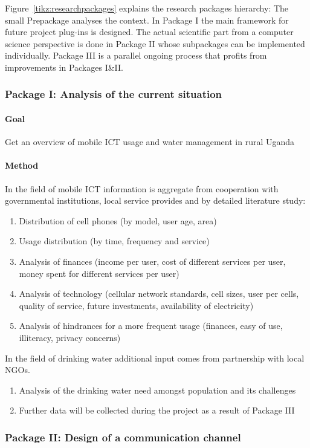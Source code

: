 \documentclass[11pt]{article}
\begin{document}
Figure~\ref{tikz:researchpackages} explains the research packages hierarchy: The small Prepackage analyses the context. In Package I the main framework for future project plug-ins is designed. The actual scientific part from a computer science perspective is done in Package II whose subpackages can be implemented individually. Package III is a parallel ongoing process that profits from improvements in Packages I\&II.


\subsubsection*{Package I: Analysis of the current situation}
\paragraph{Goal} Get an overview of mobile ICT usage and water management in rural Uganda
\paragraph{Method}
In the field of mobile ICT information is aggregate from cooperation with governmental institutions, local service provides and by detailed literature study:
\begin{enumerate}
 \item Distribution of cell phones (by model, user age, area)
 \item Usage distribution (by time, frequency and service)
 \item Analysis of finances (income per user, cost of different services per user, money spent for different services per user)
 \item Analysis of technology (cellular network standards, cell sizes, user per cells, quality of service, future investments, availability of electricity)
 \item Analysis of hindrances for a more frequent usage (finances, easy of use, illiteracy, privacy concerns)
\end{enumerate}
In the field of drinking water additional input comes from partnership with local NGOs.
\begin{enumerate}
 \item Analysis of the drinking water need amongst population and its challenges
 \item Further data will be collected during the project as a result of Package III
\end{enumerate}


\subsubsection*{Package II: Design of a communication channel}
\end{document}
